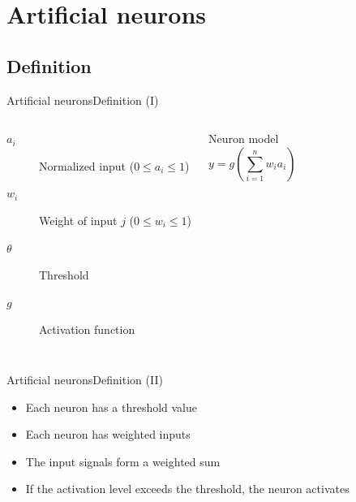 \documentclass[10pt,compress]{beamer} %
\begin{document}
\section{Artificial neurons}

\subsection{Definition}

\begin{frame}{Artificial neurons}{Definition (I)}

    

	\bigskip
    \begin{columns}
		\begin{description}
		\item[$a_i$] Normalized input ($0 \le a_i \le 1$)
		\item[$w_{i}$] Weight of input $j$ ($0 \le w_{i} \le 1$)
		\item[$\theta$] Threshold
		\item[$g$] Activation function
		\end{description}

	   \begin{block}{Neuron model}
	   \vspace{-0.5cm}
	   \begin{equation*}
	   y=g\left( \sum_{i=1}^n w_{i} a_i \right)
	   \end{equation*}
	   \end{block}
    \end{columns}
\end{frame}


\begin{frame}{Artificial neurons}{Definition (II)}
	\begin{itemize}
	\item Each neuron has a threshold value
	\item Each neuron has weighted inputs
	\item The input signals form a weighted sum
	\item If the activation level exceeds the threshold, the neuron activates
	\end{itemize}
\end{frame}
\end{document}
